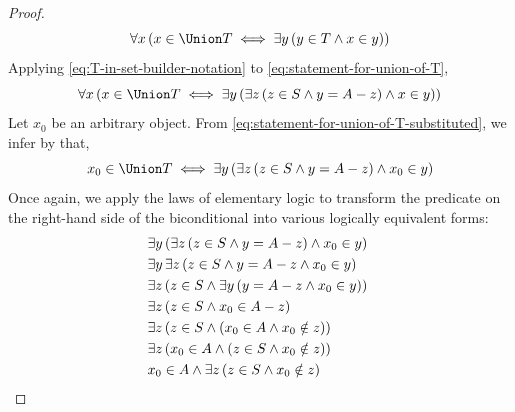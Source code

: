 \begin{proof}
\begin{equation}
        \label{eq:statement-for-union-of-T}
        \forall x \, \mleft( x \in \Union T
        \iff
        \exists y \, \mleft( y \in T \land x \in y \mright)\mright)
    \end{equation}
    Applying \eqref{eq:T-in-set-builder-notation} to \eqref{eq:statement-for-union-of-T},
    \begin{equation}
        \label{eq:statement-for-union-of-T-substituted}
        \forall x \, \mleft( x \in \Union T
        \iff
        \exists y \, \mleft( \exists z \, \mleft( z \in S \land y = A - z \mright)
        \land
        x \in y \mright)\mright)
    \end{equation}
    Let \( x_{0} \) be an arbitrary object.
    From \eqref{eq:statement-for-union-of-T-substituted}, we infer by  that,
    \begin{equation}
        \label{eq:instantiated-statement-for-union-of-T-substituted}
        x_{0} \in \Union T
        \iff
        \exists y \, \mleft( \exists z \, \mleft( z \in S \land y = A - z \mright)
        \land
        x_{0} \in y \mright)
    \end{equation}
    Once again, we apply the laws of elementary logic to transform the predicate on the right-hand side of
    the biconditional into various logically equivalent forms:
    \begin{equation*}
        \begin{aligned}
            &\exists y \, \mleft( \exists z \, \mleft( z \in S \land y = A - z \mright) \land x_{0} \in y \mright)\\
            &\exists y \, \exists z \, \mleft( z \in S \land y = A - z \land x_{0} \in y \mright)\\
            &\exists z \, \mleft( z \in S \land \exists y \, \mleft( y = A - z \land x_{0} \in y \mright) \mright)\\
            &\exists z \, \mleft( z \in S \land x_{0} \in A - z \mright)\\
            &\exists z \, \mleft( z \in S \land \mleft( x_{0} \in A \land x_{0} \notin z \mright) \mright)\\
            &\exists z \, \mleft( x_{0} \in A \land \mleft( z \in S \land x_{0} \notin z \mright) \mright)\\
            &x_{0} \in A \land \exists z \, \mleft( z \in S \land x_{0} \notin z \mright)\\
        \end{aligned}
        \text{  }

\end{equation*}
\end{proof}
